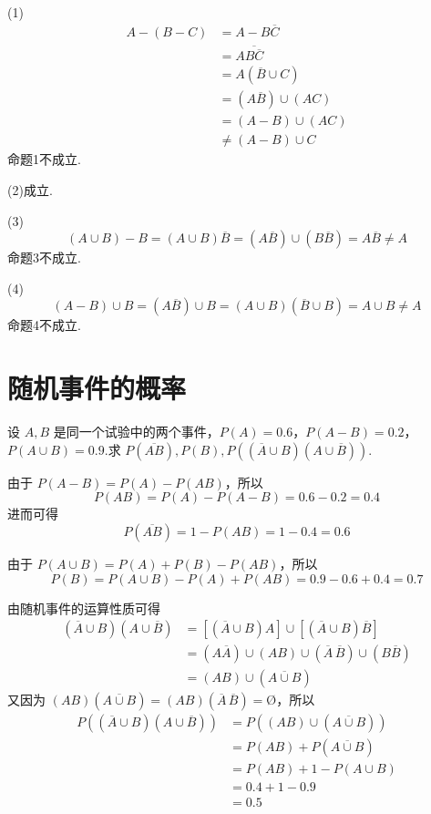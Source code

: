 \begin{solution}
    (1)
    $$
    \begin{aligned}
        A-(B-C) &= A - B \overline{C} \\
        &= A \overline{B \overline{C}} \\
        &= A (\overline{B} \cup C) \\
        &= (A \overline{B}) \cup (AC) \\
        &= (A-B) \cup (AC) \\
        & \not= (A-B) \cup C
    \end{aligned}
    $$
    命题1不成立.

    (2)成立.

    (3)
    $$
    (A \cup B) - B = (A \cup B) \overline{B} = (A \overline{B}) \cup (B \overline{B}) = A \overline{B} \not= A
    $$
    命题3不成立.

    (4)
    $$
    (A - B) \cup B = (A \overline{B}) \cup B = (A \cup B)(\overline{B} \cup B) = A \cup B \not= A
    $$
    命题4不成立.
\end{solution}

\section{随机事件的概率}

\question 设 $A,B$ 是同一个试验中的两个事件，$P(A)=0.6$，$P(A-B)=0.2$，$P(A \cup B) = 0.9$.求 $P(\overline{AB}), P(B), P((\overline{A} \cup B)(A \cup \overline{B}))$.

\begin{solution}
    由于 $P(A-B) = P(A) - P(AB)$，所以
    $$
    P(AB) = P(A) - P(A-B) = 0.6 - 0.2 = 0.4
    $$
    进而可得
    $$
    P(\overline{AB}) = 1 - P(AB) = 1 - 0.4 = 0.6
    $$

    由于 $P(A \cup B) = P(A) + P(B) - P(AB)$，所以
    $$
    P(B) = P(A \cup B) - P(A) + P(AB) = 0.9 - 0.6 + 0.4 = 0.7
    $$

    由随机事件的运算性质可得
    $$
    \begin{aligned}
        (\overline{A} \cup B)(A \cup \overline{B}) &= [(\overline{A} \cup B) A] \cup [(\overline{A} \cup B) \overline{B}] \\
        &= (A \overline{A}) \cup (AB) \cup (\overline{A} \, \overline{B}) \cup (B \overline{B}) \\
        &= (AB) \cup (\overline{A \cup B})
    \end{aligned}
    $$
    又因为 $(AB)(\overline{A \cup B}) = (AB)(\overline{A} \, \overline{B}) = \text{\O}$，所以
    $$
    \begin{aligned}
        P((\overline{A} \cup B)(A \cup \overline{B})) &= P((AB) \cup (\overline{A \cup B})) \\
        &= P(AB) + P(\overline{A \cup B}) \\
        &= P(AB) + 1 - P(A \cup B) \\
        &= 0.4 + 1 - 0.9 \\
        &= 0.5
    \end{aligned}
    $$
\end{solution}

